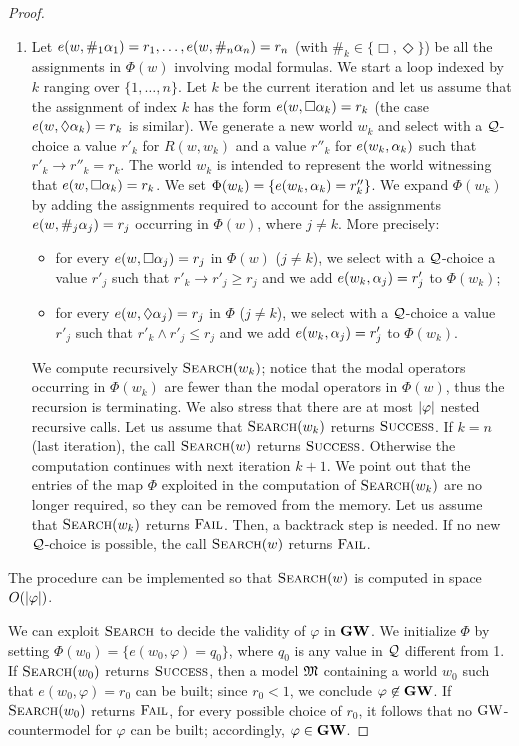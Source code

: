 \begin{proof}
\begin{enumerate}[label*=(Step~\arabic*)]
\item\label{step:2} Let $e(w,\#_1\alpha_1)=r_1,\dots,e(w,\#_n\alpha_n)=r_n$
  (with $\#_k\in\{\Box,\Diamond\}$) be all the assignments in $\Phi(w)$
  involving modal formulas.  We start a loop indexed by $k$ ranging
  over $\{1,\dots,n\}$.  Let $k$ be the current iteration and let us
  assume that the assignment of index $k$ has the form
  $e(w,\Box\alpha_k)=r_k$ (the case $e(w,\lozenge\alpha_k)=r_k$ is similar).  We
  generate a new world $w_k$ and select with a $\mathcal{Q}$-choice a value
  $r'_k$ for $R(w,w_k)$ and a value $r''_k$ for $e(w_k,\alpha_k)$ such
  that $r'_k\to r''_k = r_k$. The world $w_k$ is intended to represent
  the world witnessing that $e(w,\Box\alpha_k)=r_k$. We set
  $\Phi(w_k)=\{e(w_k,\alpha_k)=r''_k\}$.  We expand $\Phi(w_k)$ by adding
  the assignments required to account for the assignments
  $e(w,\#_j\alpha_j)=r_j$ occurring in $\Phi(w)$, where $j\neq k$. More
  precisely:
  \begin{itemize}
  \item for every $e(w,\Box \alpha_j)=r_j$ in $\Phi(w)$ ($j\neq k$), we
    select with a $\mathcal{Q}$-choice a value $r'_j$ such that $r'_k \to
    r'_j \geq r_j$ and we add $e(w_k,\alpha_j)=r'_j$ to $\Phi(w_k)$;
    

  \item for every $e(w,\lozenge \alpha_j)=r_j$ in $\Phi$ ($j\neq k$), we
    select with a $\mathcal{Q}$-choice a value $r'_j$ such that $r'_k \land
    r'_j \leq r_j$ and we add $e(w_k,\alpha_j)=r'_j$ to $\Phi(w_k)$.
  \end{itemize}
  We compute recursively $\textsc{Search}(w_k)$; notice that the modal
  operators occurring in $\Phi(w_k)$ are fewer than the modal
  operators in $\Phi(w)$, thus the recursion is terminating. We also
  stress that there are at most $|\varphi|$ nested recursive calls.
  Let us assume that $\textsc{Search}(w_k)$ returns $\textsc{Success}$.  If $k=n$
  (last iteration), the call $\textsc{Search}(w)$ returns $\textsc{Success}$.
  Otherwise the computation continues with next iteration $k+1$.  We
  point out that the entries of the map $\Phi$ exploited in the
  computation of $\textsc{Search}(w_k)$ are no longer required, so they can be
  removed from the memory.  Let us assume that $\textsc{Search}(w_k)$ returns
  $\textsc{Fail}$.  Then, a backtrack step is needed.  If no new
  $\mathcal{Q}$-choice is possible, the call $\textsc{Search}(w)$ returns $\textsc{Fail}$.
\end{enumerate}
The procedure can be implemented so that $\textsc{Search}(w)$ is computed in
space $O(|\varphi|)$.

We can exploit $\textsc{Search}$ to decide the validity of $\varphi$ in
$\mathbf{GW}$.  We initialize $\Phi$ by setting $\Phi(w_0)=\{e(w_0,\varphi)=
q_0\}$, where $q_0$ is any value in $\mathcal{Q}$ different from 1.  If
$\textsc{Search}(w_0)$ returns $\textsc{Success}$, then a model $\mathfrak{M}$ containing a
world $w_0$ such that $e(w_0,\varphi)=r_0$ can be built; since $r_0 <
1$, we conclude $\varphi\not\in \mathbf{GW}$.  If $\textsc{Search}(w_0)$ returns
$\textsc{Fail}$, for every possible choice of $r_0$, it follows that no
$\mbox{$\mathrm{GW}$}$-countermodel for $\varphi$ can be built; accordingly,
$\varphi\in \mathbf{GW}$.
\end{proof}









